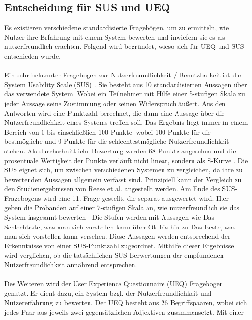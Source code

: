 \subsection{Entscheidung für SUS und UEQ}
Es existieren verschiedene standardisierte Fragebögen, um zu ermitteln, wie 
Nutzer ihre Erfahrung mit einem System bewerten und inwiefern sie es als 
nutzerfreundlich erachten. Folgend wird begründet, wieso sich für UEQ und SUS entschieden wurde. 
\\\\
Ein sehr bekannter Fragebogen zur Nutzerfreundlichkeit / Benutzbarkeit ist die 
System Usability Scale (SUS) \autocite{Brooke}. Sie besteht aus 10 
standardisierten Aussagen über das verwendete System. Wobei ein Teilnehmer mit 
Hilfe einer 5-stufigen Skala zu jeder Aussage seine Zustimmung oder seinen 
Widerspruch äußert. Aus den Antworten wird eine Punktzahl berechnet, die dann 
eine Aussage über die Nutzerfreundlichkeit eines Systems treffen soll. Das 
Ergebnis liegt immer in einem Bereich von 0 bis einschließlich 100 Punkte, wobei 
100 Punkte für die bestmögliche und 0 Punkte für die schlechtestmögliche 
Nutzerfreundlichkeit stehen. Als durchschnittliche Bewertung werden 68 Punkte 
angesehen und die prozentuale Wertigkeit der Punkte verläuft nicht linear, sondern als 
S-Kurve \autocites{Sauro}[zitiert nach][]{BrookeRetro}. Die SUS eignet sich, um zwischen verschiedenen 
Systemen zu vergleichen, da ihre zu bewertenden Aussagen allgemein verfasst sind.
Prinzipiell kann der Vergleich zu den Studienergebnissen von Reese et al. \autocite{Reese} angestellt werden. Am Ende des SUS-Fragebogens wird eine 11. Frage gestellt, die separat ausgewertet wird. Hier geben die Probanden auf einer $7$-stufigen Skala an, wie nutzerfreundlich sie das System insgesamt bewerten \autocite{SUS11}. Die Stufen werden mit Aussagen wie \glqq Das Schlechteste, was man sich vorstellen kann\grqq{} über \glqq Ok\grqq{} bis hin zu \glqq Das Beste, was man sich vorstellen kann\grqq{} versehen. Diese Aussagen werden entsprechend der Erkenntnisse von \textcite{SUS11} einer SUS-Punktzahl zugeordnet. Mithilfe dieser Ergebnisse wird verglichen, ob die tatsächlichen SUS-Berwertungen der empfundenen Nutzerfreundlichkeit annährend entsprechen.
\\\\
Des Weiteren wird der User Experience Questionnaire (UEQ) Fragebogen genutzt. Er 
dient dazu, ein System bzgl. der Nutzerfreundlichkeit und 
Nutzererfahrung zu bewerten. Der UEQ besteht aus 26 Begriffspaaren, wobei sich 
jedes Paar aus jeweils zwei gegensätzlichen Adjektiven zusammensetzt. Mit einer 

